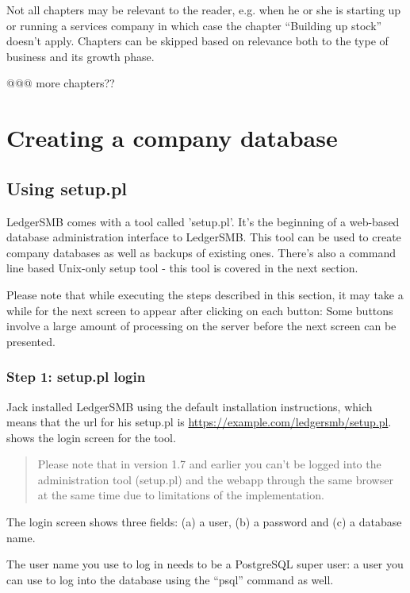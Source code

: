Not all chapters may be relevant to the reader, e.g. when he or she is starting up or
running a services company in which case the chapter ``Building up stock'' doesn't apply.
Chapters can be skipped based on relevance both to the type of business and its growth
phase.

@@@ more chapters??


\chapter{Creating a company database}
\label{cha-company-creation}

\section{Using setup.pl}
\label{sec-create-using-setup}

LedgerSMB comes with a tool called 'setup.pl'. It's the beginning of a web-based
database administration interface to LedgerSMB. This tool can be used to create
company databases as well as backups of existing ones. There's also a command line based
Unix-only setup tool - this tool is covered in the next section.

Please note that while executing the steps described in this section, it may take a while
for the next screen to appear after clicking on each button: Some buttons involve
a large amount of processing on the server before the next screen can be presented.

\subsection{Step 1: setup.pl login}
\label{subsec-create-setup-login}

Jack installed LedgerSMB using the default installation instructions, which means
that the url for his setup.pl is \url{https://example.com/ledgersmb/setup.pl}.
 shows the login screen for the tool.

\begin{quotation}
Please note that in version 1.7 and earlier you can't be logged into the administration tool (setup.pl) and the webapp
through the same browser at the same time due to limitations of the implementation.
\end{quotation}

The login screen shows three fields: (a) a user, (b) a password and (c) a database name.

The user name you use to log in needs to be a PostgreSQL super user: a user you can use
to log into the database using the ``psql'' command as well.


